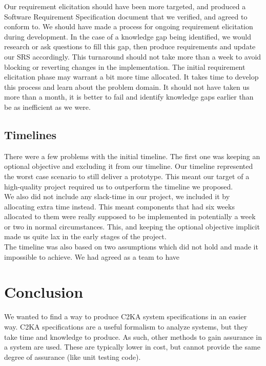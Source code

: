 \documentclass[11pt]{article}
\begin{document}
    Our requirement elicitation should have been more targeted, and produced a Software Requirement Specification document
    that we verified, and agreed to conform to.
    We should have made a process for ongoing requirement elicitation during development.
    In the case of a knowledge gap being identified, we would research or ask questions to fill this gap,
    then produce requirements and update our SRS accordingly.
    This turnaround should not take more than a week to avoid blocking or reverting changes in the implementation.
    The initial requirement elicitation phase may warrant a bit more time allocated.
    It takes time to develop this process and learn about the problem domain.
    It should not have taken us more than a month,
    it is better to fail and identify knowledge gaps earlier than be as inefficient as we were.

    \subsection{Timelines}
    There were a few problems with the initial timeline.
    The first one was keeping an optional objective and excluding it from our timeline.
    Our timeline represented the worst case scenario to still deliver a prototype.
    This meant our target of a high-quality project required us to outperform the timeline we proposed.\\

    We also did not include any slack-time in our project, we included it by allocating extra time instead.
    This meant components that had six weeks allocated
    to them were really supposed to be implemented in potentially a week or two in normal circumstances.
    This, and keeping the optional objective implicit made us quite lax in the early stages of the project.\\

    The timeline was also based on two assumptions which did not hold and made it impossible to achieve.
    We had agreed as a team to have


    \section{Conclusion}
    We wanted to find a way to produce C2KA system specifications in an easier way.
    C2KA specifications are a useful formalism to analyze systems, but they take time and knowledge to produce.
    As such, other methods to gain assurance in a system are used.
    These are typically lower in cost, but cannot provide the same degree of assurance (like unit testing code).\\
\end{document}
